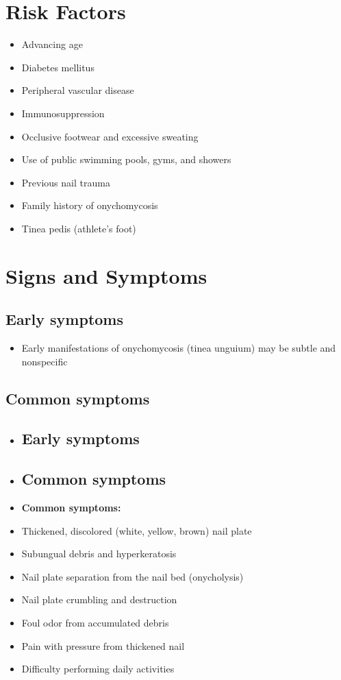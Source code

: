 \section{Risk Factors}

\begin{itemize}[noitemsep]
  \item Advancing age
  \item Diabetes mellitus
  \item Peripheral vascular disease
  \item Immunosuppression
  \item Occlusive footwear and excessive sweating
  \item Use of public swimming pools, gyms, and showers
  \item Previous nail trauma
  \item Family history of onychomycosis
  \item Tinea pedis (athlete's foot)
\end{itemize}

\section{Signs and Symptoms}

\subsection{Early symptoms}
\begin{itemize}[noitemsep]
  \item Early manifestations of onychomycosis (tinea unguium) may be subtle and nonspecific
\end{itemize}

\subsection{Common symptoms}
\begin{itemize}[noitemsep]
  \item \subsection{Early symptoms}
  \item \subsection{Common symptoms}
  \item \textbf{Common symptoms:}
  \item Thickened, discolored (white, yellow, brown) nail plate
  \item Subungual debris and hyperkeratosis
  \item Nail plate separation from the nail bed (onycholysis)
  \item Nail plate crumbling and destruction
  \item Foul odor from accumulated debris
  \item Pain with pressure from thickened nail
  \item Difficulty performing daily activities
\end{itemize}

